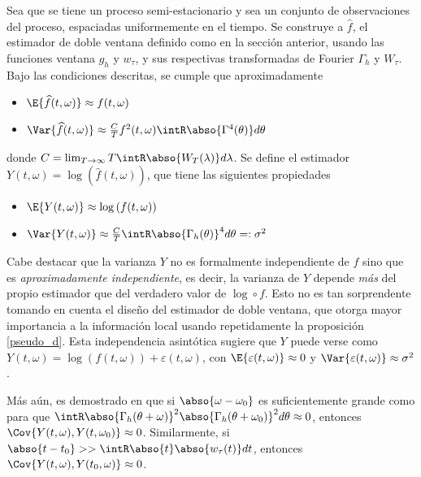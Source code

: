 Sea \xt que se tiene un proceso semi-estacionario y sea \xtd un conjunto de observaciones del 
proceso, espaciadas uniformemente en el tiempo.
Se construye a $\widehat{f}$, el estimador de doble ventana definido como en la sección anterior,
usando las funciones ventana $g_h$ y $w_\tau$, y sus respectivas transformadas de Fourier 
$\Gamma_h$ y $W_\tau$. Bajo las condiciones descritas, se cumple que aproximadamente
%
\begin{itemize}
\item $\E{\widehat{f}(t,\omega)} \approx f(t,\omega)$
\item $\Var{\widehat{f}(t,\omega)} \approx 
\frac{C}{T} f^{2}(t,\omega) \intR \abso{\Gamma^{4}(\theta)} d\theta$
\end{itemize}
%
donde $C = \lim_{T\rightarrow \infty} T \intR \abso{W_T(\lambda)} d\lambda$.
Se define el estimador $Y(t,\omega) = \log\left(\widehat{f}(t,\omega)\right)$, que tiene 
las siguientes propiedades
%
\begin{itemize}
\item $\E{Y(t,\omega)} \approx \log\left(f(t,\omega)\right)$
\item $\Var{Y(t,\omega)} \approx 
\frac{C}{T} \intR \abso{\Gamma_h(\theta)}^{4} d\theta =: \sigma^{2}$
\end{itemize}
%

Cabe destacar que la varianza $Y$ no es formalmente independiente de $f$ sino que es 
\textit{aproximadamente independiente}, es decir, la varianza de $Y$ depende \textit{más} 
del propio estimador que del verdadero valor de $\log\circ f$.
Esto no es tan sorprendente tomando en cuenta el diseño del estimador de doble ventana, que otorga 
mayor importancia a la información local usando repetidamente la proposición \ref{pseudo_d}. Esta 
independencia asintótica sugiere que $Y$ puede verse como
%
$Y(t,\omega) = \log\left(f(t,\omega) \right) + \varepsilon(t,\omega)$,
%
con $\E{\varepsilon(t,\omega)} \approx 0$ y $\Var{\varepsilon(t,\omega)} \approx \sigma^{2}$.

Más aún, es demostrado en \cite{Priestley66} que si $\abso{\omega-\omega_0}$ es suficientemente 
grande como para que 
$\intR \abso{\Gamma_h(\theta+\omega)}^{2}\abso{\Gamma_h(\theta+\omega_0)}^{2} d\theta \approx 0$,
entonces 
%
$\Cov{Y(t,\omega),Y(t,\omega_0)} \approx 0$.
%
Similarmente, si $\abso{t-t_0} >> \intR \abso{t} \abso{w_\tau (t)} dt $, entonces
%
$\Cov{Y(t,\omega),Y(t_0,\omega)} \approx 0$.

